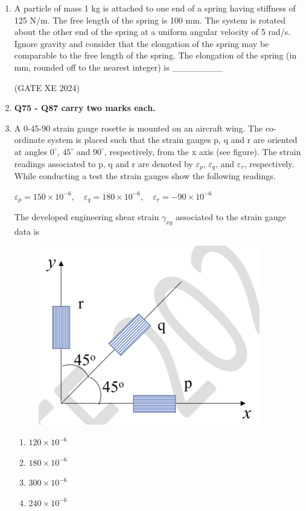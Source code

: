 \documentclass[12pt]{article}
\begin{document}
\begin{enumerate}
(GATE XE 2024)

\item A particle of mass 1 kg is attached to one end of a spring having stiffness of 125 N/m. The free length of the spring is 100 mm. The system is rotated about the other end of the spring at a uniform angular velocity of 5 rad/s. Ignore gravity and consider that the elongation of the spring may be comparable to the free length of the spring. The elongation of the spring (in mm, rounded off to the nearest integer) is \_\_\_\_\_\_\_\_

(GATE XE 2024)

\item[] \textbf{Q75 - Q87 carry two marks each.}

\item A 0-45-90 strain gauge rosette is mounted on an aircraft wing. The co-ordinate system is placed such that the strain gauges p, q and r are oriented at angles $0^\circ$, $45^\circ$ and $90^\circ$, respectively, from the x axis (see figure). The strain readings associated to p, q and r are denoted by $\varepsilon_p$, $\varepsilon_q$, and $\varepsilon_r$, respectively. While conducting a test the strain gauges show the following readings.  

$
\varepsilon_p = 150 \times 10^{-6}, \quad \varepsilon_q = 180 \times 10^{-6}, \quad \varepsilon_r = -90 \times 10^{-6}
$

The developed engineering shear strain $\gamma_{xy}$ associated to the strain gauge data is

\begin{figure}[H]
    \centering
    \includegraphics[width=0.5\columnwidth]{figs/ass5_d_q75.png}
    \caption{}
    \label{fig:placeholder}
\end{figure}

\begin{enumerate}
\item $120 \times 10^{-6}$
\item $180 \times 10^{-6}$
\item $300 \times 10^{-6}$
\item $240 \times 10^{-6}$
\end{enumerate}


\end{enumerate}
\end{document}
